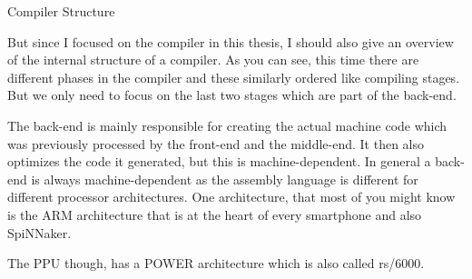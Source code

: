 \documentclass[10pt,aspectratio=169]{beamer}
\begin{document}
\begin{frame}[fragile]{Compiler Structure}
{		But since I focused on the compiler in this thesis, I should also give an overview of the internal structure of a compiler.
		As you can see, this time there are different phases in the compiler and these similarly ordered like compiling stages.
		But we only need to focus on the last two stages which are part of the back-end.
		
		The back-end is mainly responsible for creating the actual machine code which was previously processed by the front-end and the middle-end.
		It then also optimizes the code it generated, but this is machine-dependent.
		In general a back-end is always machine-dependent as the assembly language is different for different processor architectures.
		One architecture, that most of you might know is the ARM architecture that is at the heart of every smartphone and also SpiNNaker.

	The PPU though, has a POWER architecture which is also called rs/6000.}
\end{frame}
\end{document}
